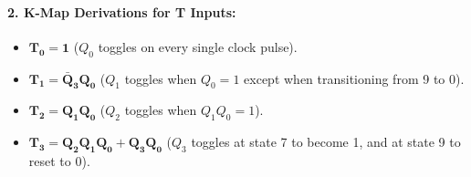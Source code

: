 \documentclass[11pt,a4paper,oneside]{book}
\begin{document}
\paragraph{2. K-Map Derivations for T Inputs:}
\begin{itemize}
  \item $\mathbf{T_0 = 1}$ ($Q_0$ toggles on every single clock pulse).
  \item $\mathbf{T_1 = \bar{Q}_3 Q_0}$ ($Q_1$ toggles when $Q_0=1$ except when transitioning from 9 to 0).
  \item $\mathbf{T_2 = Q_1 Q_0}$ ($Q_2$ toggles when $Q_1 Q_0 = 1$).
  \item $\mathbf{T_3 = Q_2 Q_1 Q_0 + Q_3 Q_0}$ ($Q_3$ toggles at state 7 to become 1, and at state 9 to reset to 0).
\end{itemize}
\end{document}
